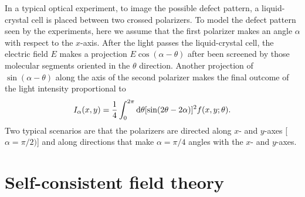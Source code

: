 \documentclass[pre,twocolumn,preprintnumbers,reprint]{revtex4}
\newcommand{\dd}{\mathrm{d}}
\begin{document}
In a typical optical experiment, to image the possible defect pattern, a liquid-crystal cell is placed between two crossed polarizers. To model the defect pattern seen by the experiments, here we assume that the first polarizer makes an angle $\alpha$ with respect to the $x$-axis.
After the light passes the liquid-crystal cell, the electric field $E$ makes a projection
  $E\cos(\alpha-\theta)$ after been screened by those molecular segments oriented in the $\theta$ direction. Another projection of $\sin(\alpha-\theta)$ along the axis of the second polarizer makes the final outcome of the light intensity proportional to
\begin{equation}\label{Idef}
I_\alpha(x,y) = {1\over 4}\int_0^{2\pi} \dd \theta [\sin(2\theta-2\alpha)]^2 f(x,y;\theta).
\end{equation}
Two typical scenarios are that the polarizers are directed along $x$- and $y$-axes [$\alpha=\pi/2)$] and along directions that make $\alpha=\pi/4$ angles with the $x$- and $y$-axes.





\section*{Self-consistent field theory}
\end{document}
